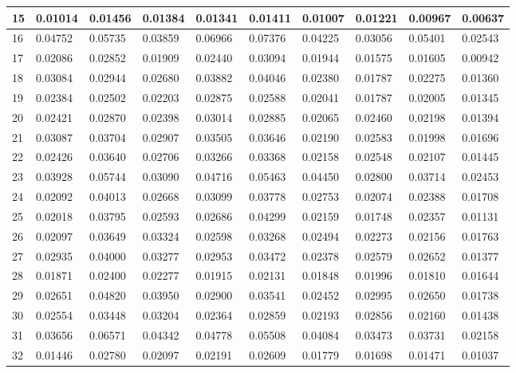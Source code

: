 \begin{table}[H]
{\begin{tabular}{|l|l|l|l|l|l|l|l|l|l|}
        15 & 0.01014 & 0.01456 & 0.01384 & 0.01341 & 0.01411 & 0.01007 & 0.01221 & 0.00967 & 0.00637 \\ \hline
        16 & 0.04752 & 0.05735 & 0.03859 & 0.06966 & 0.07376 & 0.04225 & 0.03056 & 0.05401 & 0.02543 \\ \hline
        17 & 0.02086 & 0.02852 & 0.01909 & 0.02440 & 0.03094 & 0.01944 & 0.01575 & 0.01605 & 0.00942 \\ \hline
        18 & 0.03084 & 0.02944 & 0.02680 & 0.03882 & 0.04046 & 0.02380 & 0.01787 & 0.02275 & 0.01360 \\ \hline
        19 & 0.02384 & 0.02502 & 0.02203 & 0.02875 & 0.02588 & 0.02041 & 0.01787 & 0.02005 & 0.01345 \\ \hline
        20 & 0.02421 & 0.02870 & 0.02398 & 0.03014 & 0.02885 & 0.02065 & 0.02460 & 0.02198 & 0.01394 \\ \hline
        21 & 0.03087 & 0.03704 & 0.02907 & 0.03505 & 0.03646 & 0.02190 & 0.02583 & 0.01998 & 0.01696 \\ \hline
        22 & 0.02426 & 0.03640 & 0.02706 & 0.03266 & 0.03368 & 0.02158 & 0.02548 & 0.02107 & 0.01445 \\ \hline
        23 & 0.03928 & 0.05744 & 0.03090 & 0.04716 & 0.05463 & 0.04450 & 0.02800 & 0.03714 & 0.02453 \\ \hline
        24 & 0.02092 & 0.04013 & 0.02668 & 0.03099 & 0.03778 & 0.02753 & 0.02074 & 0.02388 & 0.01708 \\ \hline
        25 & 0.02018 & 0.03795 & 0.02593 & 0.02686 & 0.04299 & 0.02159 & 0.01748 & 0.02357 & 0.01131 \\ \hline
        26 & 0.02097 & 0.03649 & 0.03324 & 0.02598 & 0.03268 & 0.02494 & 0.02273 & 0.02156 & 0.01763 \\ \hline
        27 & 0.02935 & 0.04000 & 0.03277 & 0.02953 & 0.03472 & 0.02378 & 0.02579 & 0.02652 & 0.01377 \\ \hline
        28 & 0.01871 & 0.02400 & 0.02277 & 0.01915 & 0.02131 & 0.01848 & 0.01996 & 0.01810 & 0.01644 \\ \hline
        29 & 0.02651 & 0.04820 & 0.03950 & 0.02900 & 0.03541 & 0.02452 & 0.02995 & 0.02650 & 0.01738 \\ \hline
        30 & 0.02554 & 0.03448 & 0.03204 & 0.02364 & 0.02859 & 0.02193 & 0.02856 & 0.02160 & 0.01438 \\ \hline
        31 & 0.03656 & 0.06571 & 0.04342 & 0.04778 & 0.05508 & 0.04084 & 0.03473 & 0.03731 & 0.02158 \\ \hline
        32 & 0.01446 & 0.02780 & 0.02097 & 0.02191 & 0.02609 & 0.01779 & 0.01698 & 0.01471 & 0.01037 \\ \hline

\end{tabular}}
\end{table}
